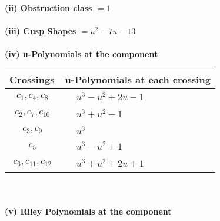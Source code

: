 \documentclass[1p]{elsarticle_modified}
\theoremstyle{definition}
\begin{document}
\flushleft \textbf{(ii) Obstruction class $= 1$}\\~\\
\flushleft \textbf{(iii) Cusp Shapes $= u^2-7 u-13$}\\~\\
\newpage\renewcommand{\arraystretch}{1}
\flushleft \textbf{(iv) u-Polynomials at the component}\newline \\
\begin{tabular}{m{50pt}|m{274pt}}
Crossings & \hspace{64pt}u-Polynomials at each crossing \\
\hline $$\begin{aligned}c_{1},c_{4},c_{8}\end{aligned}$$&$\begin{aligned}
&u^3- u^2+2 u-1
\end{aligned}$\\
\hline $$\begin{aligned}c_{2},c_{7},c_{10}\end{aligned}$$&$\begin{aligned}
&u^3+u^2-1
\end{aligned}$\\
\hline $$\begin{aligned}c_{3},c_{9}\end{aligned}$$&$\begin{aligned}
&u^3
\end{aligned}$\\
\hline $$\begin{aligned}c_{5}\end{aligned}$$&$\begin{aligned}
&u^3- u^2+1
\end{aligned}$\\
\hline $$\begin{aligned}c_{6},c_{11},c_{12}\end{aligned}$$&$\begin{aligned}
&u^3+u^2+2 u+1
\end{aligned}$\\
\hline
\end{tabular}\\~\\
\newpage\renewcommand{\arraystretch}{1}
\flushleft \textbf{(v) Riley Polynomials at the component}\newline \\
\end{document}
